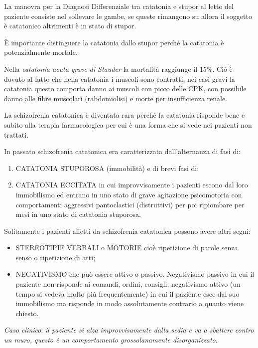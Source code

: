 \documentclass[]{article}
\begin{document}
La manovra per la Diagnosi Differenziale tra catatonia e stupor al letto
del paziente consiste nel sollevare le gambe, se queste rimangono su
allora il soggetto è catatonico altrimenti è in stato di stupor.

È importante distinguere la catatonia dallo stupor perché la catatonia è
potenzialmente mortale.

Nella \emph{\emph{catatonia acuta grave di Stauder}} la mortalità
raggiunge il 15\%. Ciò è dovuto al fatto che nella catatonia i muscoli
sono contratti, nei casi gravi la catatonia questo comporta danno ai
muscoli con picco delle CPK, con possibile danno alle fibre muscolari
(rabdomiolisi) e morte per insufficienza renale.

La schizofrenia catatonica è diventata rara perché la catatonia risponde
bene e subito alla terapia farmacologica per cui è una forma che si vede
nei pazienti non trattati.

In passato schizofrenia catatonica era caratterizzata dall'alternanza di
fasi di:

\begin{enumerate}
\def\labelenumi{\arabic{enumi}.}
\item
  CATATONIA STUPOROSA (immobilità) e di brevi fasi di:
\item
  CATATONIA ECCITATA in cui improvvisamente i pazienti escono dal loro
  immobilismo ed entrano in uno stato di grave agitazione psicomotoria
  con comportamenti aggressivi pantoclastici (distruttivi) per poi
  ripiombare per mesi in uno stato di catatonia stuporosa.
\end{enumerate}

Solitamente i pazienti affetti da schizofrenia catatonica possono avere
altri segni:

\begin{itemize}
\item
  STEREOTIPIE VERBALI o MOTORIE cioè ripetizione di parole senza senso o
  ripetizione di atti;
\item
  NEGATIVISMO che può essere attivo o passivo. Negativismo passivo in
  cui il paziente non risponde ai comandi, ordini, consigli; negativismo
  attivo (un tempo si vedeva molto più frequentemente) in cui il
  paziente esce dal suo immobilismo ma risponde in modo assolutamente
  contrario a quanto viene chiesto.
\end{itemize}

\emph{Caso clinico}: \emph{il paziente si alza improvvisamente dalla
sedia e va a sbattere contro un muro, questo è un comportamento
grossolanamente disorganizzato}.
\end{document}
